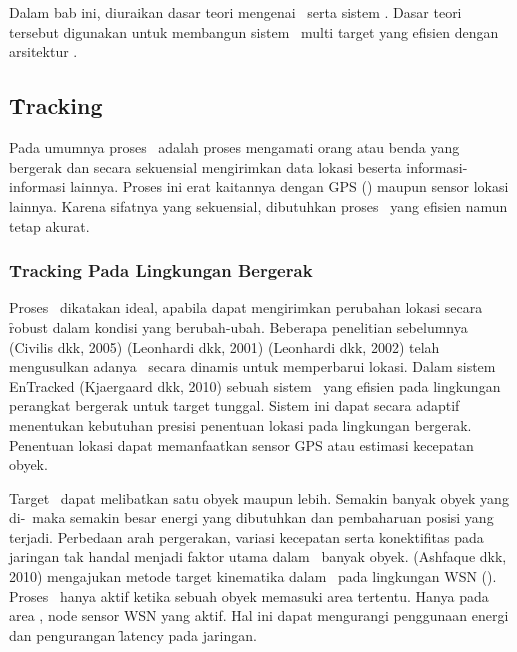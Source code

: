 \chapter{\babDua}

Dalam bab ini, diuraikan dasar teori mengenai \tracking~serta sistem \pubsub.
Dasar teori tersebut digunakan untuk membangun sistem \tracking~multi target
yang efisien dengan arsitektur \pubsub.

\section{\f{Tracking}}

Pada umumnya proses \tracking~adalah proses mengamati orang atau benda yang
bergerak dan secara sekuensial mengirimkan data lokasi beserta
informasi-informasi lainnya.  Proses ini erat kaitannya dengan GPS (\GPS)
maupun sensor lokasi lainnya. Karena sifatnya yang sekuensial, dibutuhkan
proses \tracking~yang efisien namun tetap akurat.

\subsection{\f{Tracking} Pada Lingkungan Bergerak}

Proses \tracking~dikatakan ideal, apabila dapat mengirimkan perubahan lokasi
secara \f{robust} dalam kondisi yang berubah-ubah. Beberapa penelitian sebelumnya
(Civilis dkk, 2005) (Leonhardi dkk, 2001) (Leonhardi dkk, 2002) telah mengusulkan
adanya \tracking~secara dinamis untuk memperbarui lokasi. Dalam sistem EnTracked
(Kjaergaard dkk, 2010) sebuah sistem \tracking~yang efisien pada lingkungan
perangkat bergerak untuk target tunggal. Sistem ini dapat secara adaptif
menentukan kebutuhan presisi penentuan lokasi pada lingkungan bergerak. Penentuan 
lokasi dapat memanfaatkan sensor GPS atau estimasi kecepatan obyek.

Target \tracking~dapat melibatkan satu obyek maupun lebih. Semakin banyak obyek
yang di-\tracking~maka semakin besar energi yang dibutuhkan dan pembaharuan
posisi yang terjadi. Perbedaan arah pergerakan, variasi kecepatan serta
konektifitas pada jaringan tak handal menjadi faktor utama dalam
\tracking~banyak obyek. (Ashfaque dkk, 2010) mengajukan metode
target kinematika dalam \tracking~pada lingkungan WSN (\wsn). Proses
\tracking~hanya aktif ketika sebuah obyek memasuki area tertentu.  Hanya pada
area \tracking, node sensor WSN yang aktif. Hal ini dapat mengurangi penggunaan
energi dan pengurangan \f{latency} pada jaringan.

